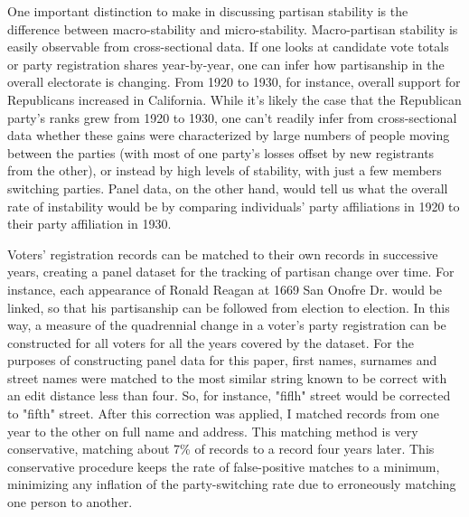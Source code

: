 \documentclass[11pt]{scrartcl}\usepackage[]{graphicx}\usepackage[]{color}
\begin{document}
One important distinction to make in discussing partisan stability is the difference between macro-stability and micro-stability.  Macro-partisan stability is easily observable from cross-sectional data. If one looks at candidate vote totals or party registration shares year-by-year, one can infer how partisanship in the overall electorate is changing.  From 1920 to 1930, for instance, overall support for Republicans increased in California. While it's likely the case that the Republican party's ranks grew from 1920 to 1930, one can't readily infer from cross-sectional data whether these gains were characterized by large numbers of people moving between the parties (with most of one party's losses offset by new registrants from the other), or instead by high levels of stability, with just a few members switching parties. Panel data, on the other hand, would tell us what the overall rate of instability would be by comparing individuals' party affiliations in 1920 to their party affiliation in 1930.

Voters' registration records can be matched to their own records in successive years, creating a panel dataset for the tracking of partisan change over time.  For instance, each appearance of Ronald Reagan at 1669 San Onofre Dr. would be linked, so that his partisanship can be followed from election to election. In this way, a measure of the quadrennial change in a voter's party registration can be constructed for all voters for all the years covered by the dataset.  For the purposes of constructing panel data for this paper, first names, surnames and street names were matched to the most similar string known to be correct with an edit distance less than four. So, for instance, "fiflh" street would be corrected to "fifth" street. After this correction was applied, I matched records from one year to the other on full name and address. This matching method is very conservative, matching about 7\% of records to a record four years later. This conservative procedure keeps the rate of false-positive matches to a minimum, minimizing any inflation of the party-switching rate due to erroneously matching one person to another.
\end{document}
